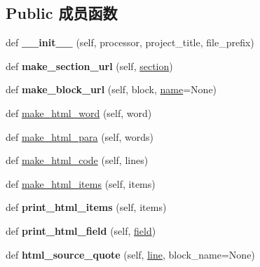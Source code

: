 \subsection*{Public 成员函数}
\begin{DoxyCompactItemize}
\item 
\mbox{\label{classtohtml_1_1_html_formatter_aa52f084d5be34256a5cd8e2c714dd979}} 
def {\bfseries \+\_\+\+\_\+init\+\_\+\+\_\+} (self, processor, project\+\_\+title, file\+\_\+prefix)
\item 
\mbox{\label{classtohtml_1_1_html_formatter_a5a9846bd3b63d0b2c19ea8753442cf76}} 
def {\bfseries make\+\_\+section\+\_\+url} (self, \hyperlink{structsection}{section})
\item 
\mbox{\label{classtohtml_1_1_html_formatter_abc19103fd2f7dd0571af9cf2b6cf9f5a}} 
def {\bfseries make\+\_\+block\+\_\+url} (self, block, \hyperlink{structname}{name}=None)
\item 
def \hyperlink{classtohtml_1_1_html_formatter_a7eeb95b937b988a88537e32ace23a65f}{make\+\_\+html\+\_\+word} (self, word)
\item 
def \hyperlink{classtohtml_1_1_html_formatter_a8c7fac47f3d089b2756287b0c4e6034f}{make\+\_\+html\+\_\+para} (self, words)
\item 
def \hyperlink{classtohtml_1_1_html_formatter_af449a521ac7ae4d1f01b7741d72b8116}{make\+\_\+html\+\_\+code} (self, lines)
\item 
def \hyperlink{classtohtml_1_1_html_formatter_ab39a6e0b6b849637aaea4a4b4ba0f0a6}{make\+\_\+html\+\_\+items} (self, items)
\item 
\mbox{\label{classtohtml_1_1_html_formatter_ae86bbfdfbc2a44c68ac0594ddb5cf144}} 
def {\bfseries print\+\_\+html\+\_\+items} (self, items)
\item 
\mbox{\label{classtohtml_1_1_html_formatter_a925a22a4be60ac142deb9fcc7940fc57}} 
def {\bfseries print\+\_\+html\+\_\+field} (self, \hyperlink{structfield}{field})
\item 
\mbox{\label{classtohtml_1_1_html_formatter_a844674ce2d1de46bf2d86b26aa607775}} 
def {\bfseries html\+\_\+source\+\_\+quote} (self, \hyperlink{structline}{line}, block\+\_\+name=None)

\end{DoxyCompactItemize}
